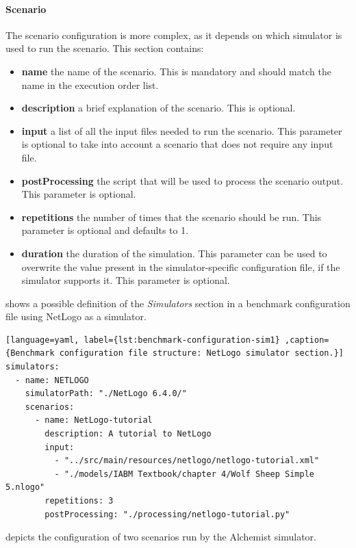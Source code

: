 \documentclass[12pt,a4paper,openright,twoside]{book}
\begin{document}
\paragraph*{Scenario}
The scenario configuration is more complex, as it depends on which simulator is used to run the scenario.
This section contains:
\begin{itemize}
  \item \textbf{name} the name of the scenario. This is mandatory and should match the name in the execution order list.
  \item \textbf{description} a brief explanation of the scenario. This is optional.
  \item \textbf{input} a list of all the input files needed to run the scenario. This parameter is optional to take into account a scenario that does not require any input file.
  \item \textbf{postProcessing} the script that will be used to process the scenario output. This parameter is optional.
  \item \textbf{repetitions} the number of times that the scenario should be run. This parameter is optional and defaults to 1.
  \item \textbf{duration} the duration of the simulation. This parameter can be used to overwrite the value present in the simulator-specific configuration file, if the simulator supports it. This parameter is optional.
\end{itemize}

 shows a possible definition of the \emph{Simulators} section in a benchmark configuration file using NetLogo as a simulator.

\begin{lstlisting}[language=yaml, label={lst:benchmark-configuration-sim1} ,caption={Benchmark configuration file structure: NetLogo simulator section.}]
simulators:
  - name: NETLOGO
    simulatorPath: "./NetLogo 6.4.0/"
    scenarios:
      - name: NetLogo-tutorial
        description: A tutorial to NetLogo
        input:
          - "../src/main/resources/netlogo/netlogo-tutorial.xml"
          - "./models/IABM Textbook/chapter 4/Wolf Sheep Simple 5.nlogo"
        repetitions: 3
        postProcessing: "./processing/netlogo-tutorial.py"
\end{lstlisting}

 depicts the configuration of two scenarios run by the Alchemist simulator.
\end{document}
